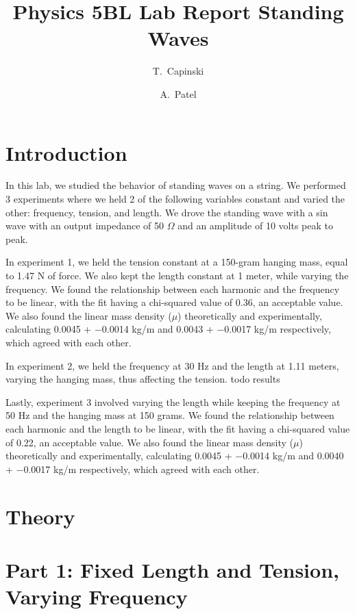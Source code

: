 \documentclass[11pt]{article}
\title{Physics 5BL Lab Report Standing Waves}
\author{T.~Capinski \and A.~Patel}
\let\oldsection\section
\renewcommand\section{\clearpage\oldsection}
\begin{document}
    \maketitle
    \tableofcontents

    \section*{Introduction}\label{sec:introduction}
    In this lab, we studied the behavior of standing waves on a string. We performed 3 experiments where we held 2 of the following variables constant and varied the other: frequency, tension, and length. We drove the standing wave with a sin wave with an output impedance of 50 $\Omega$ and an amplitude of 10 volts peak to peak.

    In experiment 1, we held the tension constant at a 150-gram hanging mass, equal to 1.47 N of force. We also kept the length constant at 1 meter, while varying the frequency. We found the relationship between each harmonic and the frequency to be linear, with the fit having a chi-squared value of 0.36, an acceptable value. We also found the linear mass density ($\mu$) theoretically and experimentally, calculating 0.0045 + −0.0014 kg/m and 0.0043 + −0.0017 kg/m respectively, which agreed with each other.

    In experiment 2, we held the frequency at 30 Hz and the length at 1.11 meters, varying the hanging mass, thus affecting the tension. todo results

    Lastly, experiment 3 involved varying the length while keeping the frequency at 50 Hz and the hanging mass at 150 grams. We found the relationship between each harmonic and the length to be linear, with the fit having a chi-squared value of 0.22, an acceptable value. We also found the linear mass density ($\mu$) theoretically and experimentally, calculating 0.0045 + −0.0014 kg/m and 0.0040 + −0.0017 kg/m  respectively, which agreed with each other.

    
    \section*{Theory}\label{sec:theory}

    \section{Part 1: Fixed Length and Tension, Varying Frequency}\label{sec:part_1}
\end{document}
